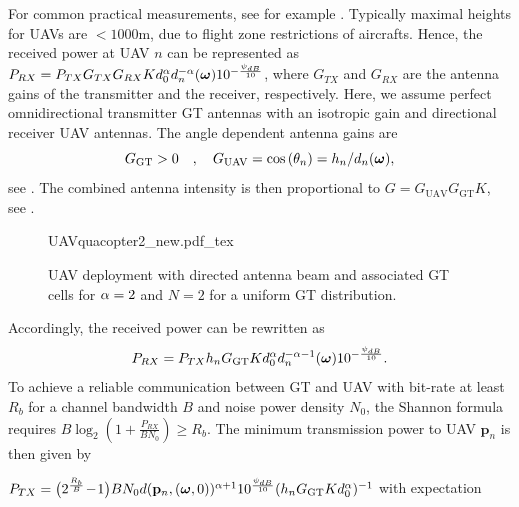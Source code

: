 \documentclass[12pt,onecolumn,journal,draftclsnofoot,letterpaper]{IEEEtran}
\newif\ifarxiv\arxivfalse
\newcounter{example}[section]
\renewcommand{\vq}{\mathbf p}
\newcommand{\Rb}{\ensuremath{R_b}}         %
\newcommand{\GGT}{\ensuremath{G_{\text{GT}}}}         %
\newcommand{\GUAV}{\ensuremath{G_{\text{UAV}}}}         %
\begin{document}
%
For common practical measurements, see for example \cite{AG18}.  Typically
maximal heights for UAVs are $<1000$m, due to flight zone restrictions of aircrafts.  Hence, the received power at
UAV $n$ can be represented as
%
$P_{RX}=P_{TX}G_{TX}G_{RX}Kd^{\alpha}_0 d_n^{-\alpha}(\boldsymbol{ \omega})10^{-\frac{\psi_{dB}}{10}}$,
%
where $G_{TX}$ and $G_{RX}$ are the antenna gains of the transmitter and the receiver, respectively. Here, we assume
perfect omnidirectional transmitter GT antennas with an isotropic gain and directional receiver UAV antennas.  The
angle dependent antenna gains are %
%
\begin{equation}
\GGT >0\quad,\quad
  \GUAV = \cos\left(\theta_n\right)=h_n/d_n(\vome),
\label{eq:Gdirected}
\end{equation}
%
see \cite[p.52]{Bal05a}. The combined antenna intensity is then proportional to
%
$G=\GUAV \GGT K$, see .
%
\begin{figure}
  \centering
  \def\svgwidth{.85\textwidth} \scriptsize{
    {UAVquacopter2_new.pdf_tex}}
    \caption{UAV deployment with directed antenna beam and associated GT cells for $\alpha=2$ and $N=2$ for a uniform GT distribution.}
    \label{fig:uavdirected}
\end{figure}
%
Accordingly, the received power can be rewritten as
%
\begin{equation}
  P_{RX}=P_{TX}h_n \GGT K d^{\alpha}_0 d_n^{-\alpha-1}(\vome)10^{-\frac{\psi_{dB}}{10}}.
\end{equation}
%
To achieve a reliable communication between GT and UAV with bit-rate at least $\Rb$ for a
channel bandwidth $B$ and noise power density $N_0$, the Shannon formula requires 
$B\log_2\left(1+\frac{P_{RX}}{BN_0}\right)\ge\Rb$.
The minimum transmission power to UAV $\vq_n$ is then given by%
\ifarxiv
\begin{align}
P_{TX}=\big(2^{\frac{\Rb}{B}}\!-\!1\big)B N_0d(\vq_n,(\vome,0))^{\alpha+1}10^{\frac{\psi_{dB}}{10}} (h_n \GGT
Kd^{\alpha}_0)^{-1}
\end{align}
\else
$P_{TX}=\big(2^{\frac{\Rb}{B}}\!-\!1\big)B N_0d(\vq_n,(\vome,0))^{\alpha+1}10^{\frac{\psi_{dB}}{10}} (h_n \GGT
Kd^{\alpha}_0)^{-1}$
\fi%
with expectation
%
%
\end{document}
